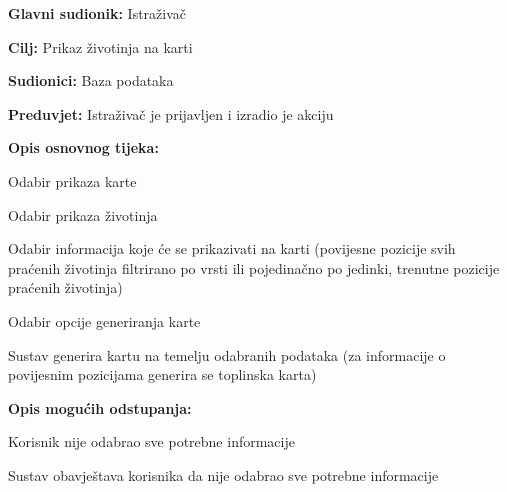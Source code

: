 					\noindent {}
					\begin{packed_item}
						
						\item \textbf{Glavni sudionik: }Istraživač
						\item  \textbf{Cilj:} Prikaz životinja na karti
						\item  \textbf{Sudionici:} Baza podataka
						\item  \textbf{Preduvjet:} Istraživač je prijavljen i izradio je akciju
						\item  \textbf{Opis osnovnog tijeka:}
						
						\item[] \begin{packed_enum}
							
							\item Odabir prikaza karte
							\item Odabir prikaza životinja 
							
							\item Odabir informacija koje će se prikazivati na karti (povijesne pozicije svih praćenih životinja filtrirano po vrsti ili pojedinačno po jedinki, trenutne pozicije praćenih životinja)
							\item Odabir opcije generiranja karte
							\item Sustav generira kartu na temelju odabranih podataka (za informacije o povijesnim pozicijama generira se toplinska karta)
							
						\end{packed_enum}
						\item  \textbf{Opis mogućih odstupanja:}
						
						\item[] \begin{packed_item}
							
							\item[5.a]Korisnik nije odabrao sve potrebne informacije 
							\item[] \begin{packed_enum}
								
								\item Sustav obavještava korisnika da nije odabrao sve potrebne informacije
								
							\end{packed_enum}
							
						\end{packed_item}
					\end{packed_item}
						
